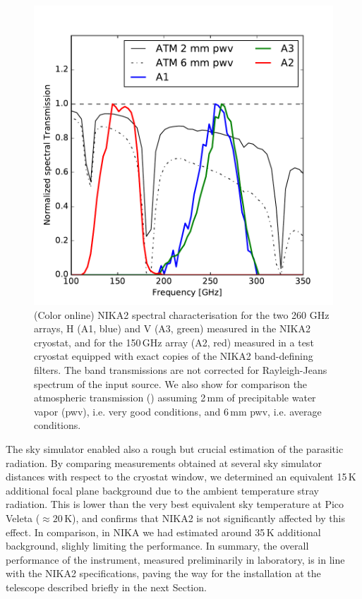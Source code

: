 \documentclass[]{aa} %
\begin{document}
\begin{figure}[h]
   \centering
    \includegraphics[width=1.0\linewidth]{atm_transmission.pdf}
      \caption{(Color online) NIKA2 spectral characterisation for the two 260 GHz arrays, H (A1, blue) and V (A3, green) measured in the NIKA2 cryostat, and for the 150\,GHz array (A2, red) measured in a test cryostat equipped with exact copies of the NIKA2 band-defining filters. The band transmissions are not corrected for Rayleigh-Jeans spectrum of the input source. We also show for comparison the atmospheric transmission (\cite{Pardo2002}) assuming 2\,mm of precipitable water vapor (pwv), i.e. very good conditions, and 6\,mm pwv, i.e. average conditions.
         \label{Fig4}}
\end{figure}

The sky simulator enabled also a rough but crucial estimation of the parasitic radiation. By comparing measurements obtained at several sky simulator distances with respect to the cryostat window, we determined an equivalent 15\,K additional focal plane background due to the ambient temperature stray radiation. This is lower than the very best equivalent sky temperature at Pico Veleta ($\approx 20\,\textrm{K}$), and confirms that NIKA2 is not significantly affected by this effect. In comparison, in NIKA we had estimated around 35\,K additional background, slighly limiting the performance. 
In summary, the overall performance of the instrument, measured preliminarily in laboratory, is in line with the NIKA2 specifications, paving the way for the installation at the telescope described briefly in the next Section. 
\end{document}
